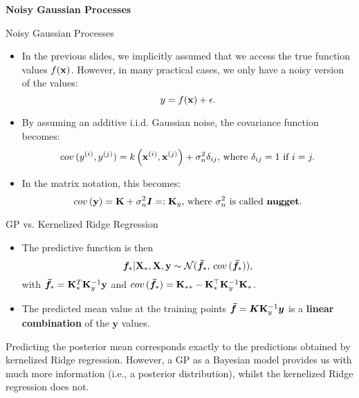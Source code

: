 
\begin{frame}[c]{}
\centering
\huge
\textbf{Noisy Gaussian Processes}
\end{frame}


\begin{frame}[c]{Noisy Gaussian Processes}

\begin{itemize}
\item In the previous slides, we implicitly assumed that we access the true function values $f(\mathbf{x})$. However, in many practical cases, we only have a noisy version of the values:
$$y = f(\mathbf{x}) + \epsilon.$$ 

\item By assuming an additive i.i.d. Gaussian noise, the covariance function becomes:
$$cov\,(y^{(i)}, y^{(j)})=k\left(\mathbf{x}^{(i)}, \mathbf{x}^{(j)}\right) + \sigma^2_n \delta_{ij} \text{, where } \delta_{ij} = 1 \text{ if } i=j.$$

\item In the matrix notation, this becomes:
$$cov\,(\mathbf{y}) = \mathbf{K} + \sigma^2_n\boldsymbol{I} =: \mathbf{K}_y \text{, where } \sigma^2_n \text{ is called \textbf{nugget}.}$$

\end{itemize}
\end{frame}


\begin{frame}[c]{GP vs. Kernelized Ridge Regression}

\begin{itemize}

\item The predictive function is then 
\vspace{-3mm}
$$\bm{f}_* | \mathbf{X}_*, \mathbf{X}, \mathbf{y} \sim \mathcal{N}(\bm{\bar f}_*, \,cov\,(\bm{\bar f}_*)),$$ 
\vspace{-5mm}
with $\bm{\bar f}_* = \mathbf{K}_{*}^{T} \mathbf{K}_y^{-1}\mathbf{y}$ and $cov\,(\bm{\bar f}_*) = \mathbf{K}_{**}- \mathbf{K}_{*}^\top\mathbf{K}_y^{-1}\mathbf{K}_*$.
\lz
\lz

\item The predicted mean value at the training points $\bm{\bar f} = \bm{K}\mathbf{K}_y^{-1}\bm{y}$ is a \textbf{linear combination} of the $\bm{y}$ values. 
\end{itemize}

\lz
\textcolor{blue}{\faLightbulbO} Predicting the posterior mean corresponds exactly to the predictions obtained by kernelized Ridge regression. However, a GP as a Bayesian model provides us with much more information (i.e., a posterior distribution), whilst the kernelized Ridge regression does not. 

\end{frame}

